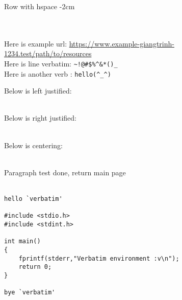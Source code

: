 \documentclass[12pt, a4paper]{report}
\begin{document}
\hspace{-2cm} Row with hspace -2cm\\

\vfill

\lipsum[2]


\newpage 

\fbox{\lipsum[1]}\\
\hbox{\lipsum[2]}\\

Here is example url: \url{https://www.example-giangtrinh-1234.test/path/to/resources}\\

Here is line verbatim: \verb=~!@#$%^&*()_=\\

Here is another verb : \verb**hello(^_^)*\\ 


\newpage

\begin{flushleft}
    Below is left justified:\\
    \lipsum[1]\\
\end{flushleft}

\begin{flushright}
    Below is right justified:\\
    \lipsum[2]\\
\end{flushright}

\begin{center}
    Below is centering:\\
    \lipsum[3]\\
\end{center}

\vspace{1cm}Paragraph test done, return main page\\
\lipsum[4]\\



\begin{verbatim}
hello `verbatim'

#include <stdio.h>
#include <stdint.h>

int main()
{
    fprintf(stderr,"Verbatim environment :v\n");
    return 0;
}

bye `verbatim'
\end{verbatim}
\end{document}
